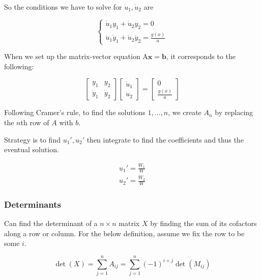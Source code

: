 So the conditions we have to solve for $\dot u_1,\dot u_2$ are

\begin{equation}
    \begin{cases}
        \dot u_1y_1+\dot u_2y_2=0\\
        \dot u_1\dot y_1 + \dot u_2\dot y_2=\frac{g(x)}{a}
    \end{cases}
\end{equation}

When we set up the matrix-vector equation $\mathrm{A}\mathbf{x}=\mathbf{b}$, it corresponds to the following:

\begin{equation}
    \begin{bmatrix}
        y_1 & y_2\\
        \dot y_1 & \dot y_2
    \end{bmatrix}
    \begin{bmatrix}
        \dot u_1\\\dot u_2
    \end{bmatrix}
    =\begin{bmatrix}
        0\\\frac{g(x)}{a}
    \end{bmatrix}
\end{equation}

Following Cramer's rule, to find the solutions $1,\ldots,n$, we create $A_n$ by replacing the $n$th row of $A$ with $b$.

Strategy is to find $u_1', u_2'$ then integrate to find the coefficients and thus the eventual solution.

\begin{eqnarray}
    u_1'=\frac{W_1}{W}\\
    u_2'=\frac{W_2}{W}
\end{eqnarray}

\subsubsection{Determinants}

Can find the determinant of a $n\times n$ matrix $X$ by finding the sum of its cofactors along a row or column. For the below definition,
assume we fix the row to be some $i$.

\begin{equation}
    \det (X)=\sum_{j=1}^n A_{ij}=\sum_{j=1}^n (-1)^{i+j}\det (M_{ij})
\end{equation}

